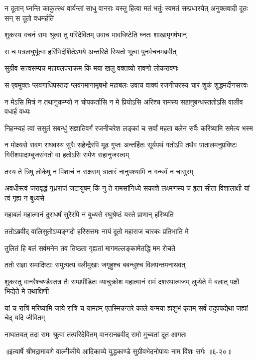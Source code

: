 \threelineshloka
{न दूतान् घ्नन्ति काकुत्स्थ वार्यन्तां साधु वानराः}
{यस्तु हित्वा मतं भर्तुः स्वमतं सम्प्रधारयेत्}
{अनुक्तवादी दूतः सन् स दूतो वधमर्हति} %

\twolineshloka
{शुकस्य वचनं रामः श्रुत्वा तु परिदेवितम्}
{उवाच मावधिष्टेति घ्नतः शाखामृगर्षभान्} %

\twolineshloka
{स च पत्रलघुर्भूत्वा हरिभिर्दर्शितेऽभये}
{अन्तरिक्षे स्थितो भूत्वा पुनर्वचनमब्रवीत्} %

\twolineshloka
{सुग्रीव सत्त्वसम्पन्न महाबलपराक्रम}
{किं मया खलु वक्तव्यो रावणो लोकरावणः} %

\twolineshloka
{स एवमुक्तः प्लवगाधिपस्तदा प्लवंगमानामृषभो महाबलः}
{उवाच वाक्यं रजनीचरस्य चारं शुकं शुद्धमदीनसत्त्वः} %

\twolineshloka
{न मेऽसि मित्रं न तथानुकम्प्यो न चोपकर्तासि न मे प्रियोऽसि}
{अरिश्च रामस्य सहानुबन्धस्ततोऽसि वालीव वधार्ह वध्यः} %

\twolineshloka
{निहन्म्यहं त्वां ससुतं सबन्धुं सज्ञातिवर्गं रजनीचरेश}
{लङ्कां च सर्वां महता बलेन सर्वैः करिष्यामि समेत्य भस्म} %

\threelineshloka
{न मोक्ष्यसे रावण राघवस्य सुरैः सहेन्द्रैरपि मूढ गुप्तः}
{अन्तर्हितः सूर्यपथं गतोऽपि तथैव पातालमनुप्रविष्टः}
{गिरीशपादाम्बुजसंगतो वा हतोऽसि रामेण सहानुजस्त्वम्} %

\twolineshloka
{तस्य ते त्रिषु लोकेषु न पिशाचं न राक्षसम्}
{त्रातारं नानुपश्यामि न गन्धर्वं न चासुरम्} %

\threelineshloka
{अवधीस्त्वं जरावृद्धं गृध्रराजं जटायुषम्}
{किं नु ते रामसांनिध्ये सकाशे लक्ष्मणस्य च}
{हृता सीता विशालाक्षी यां त्वं गृह्य न बुध्यसे} %

\twolineshloka
{महाबलं महात्मानं दुराधर्षं सुरैरपि}
{न बुध्यसे रघुश्रेष्ठं यस्ते प्राणान् हरिष्यति} %

\twolineshloka
{ततोऽब्रवीद् वालिसुतोऽप्यङ्गदो हरिसत्तमः}
{नायं दूतो महाराज चारकः प्रतिभाति मे} %

\twolineshloka
{तुलितं हि बलं सर्वमनेन तव तिष्ठता}
{गृह्यतां मागमल्लङ्कामेतद्धि मम रोचते} %

\twolineshloka
{ततो राज्ञा समादिष्टाः समुत्पत्य वलीमुखाः}
{जगृहुश्च बबन्धुश्च विलपन्तमनाथवत्} %

\threelineshloka
{शुकस्तु वानरैश्चण्डैस्तत्र तैः सम्प्रपीडितः}
{व्याचुक्रोश महात्मानं रामं दशरथात्मजम्}
{लुप्येते मे बलात् पक्षौ भिद्येते मे तथाक्षिणी} %

\threelineshloka
{यां च रात्रिं मरिष्यामि जाये रात्रिं च यामहम्}
{एतस्मिन्नन्तरे काले यन्मया ह्यशुभं कृतम्}
{सर्वं तदुपपद्येथा जह्यां चेद् यदि जीवितम्} %

\twolineshloka
{नाघातयत् तदा रामः श्रुत्वा तत्परिदेवितम्}
{वानरानब्रवीद् रामो मुच्यतां दूत आगतः} %


॥इत्यार्षे श्रीमद्रामायणे वाल्मीकीये आदिकाव्ये युद्धकाण्डे सुग्रीवभेदनोपायः नाम विंशः सर्गः ॥६-२०॥
